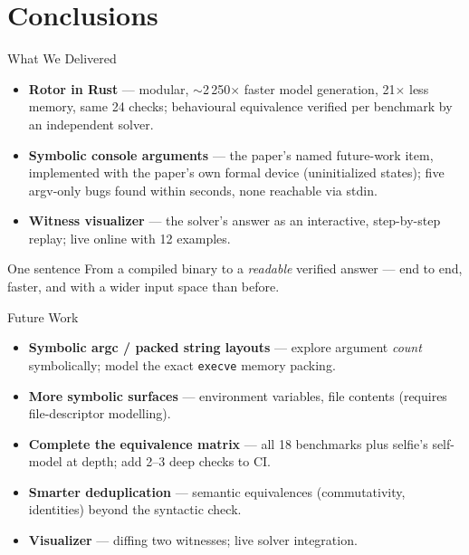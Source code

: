 \documentclass[aspectratio=169]{beamer}
\newcommand{\keylab}[1]{\textbf{\color{blue!55!black}#1}}
\begin{document}
\part{Conclusions}
\begin{frame}
  \partpage
\end{frame}

\begin{frame}{What We Delivered}
  \begin{itemize}\setlength\itemsep{0.55em}
    \item \keylab{Rotor in Rust} --- modular, $\sim$2\,250$\times$
          faster model generation, 21$\times$ less memory, same 24
          checks; behavioural equivalence verified per benchmark by an
          independent solver.
    \item \keylab{Symbolic console arguments} --- the paper's named
          future-work item, implemented with the paper's own formal
          device (uninitialized states); five argv-only bugs found
          within seconds, none reachable via stdin.
    \item \keylab{Witness visualizer} --- the solver's answer as an
          interactive, step-by-step replay; live online with 12
          examples.
  \end{itemize}
  \vspace{0.1cm}
  \begin{block}{One sentence}
    From a compiled binary to a \emph{readable} verified answer ---
    end to end, faster, and with a wider input space than before.
  \end{block}
\end{frame}

\begin{frame}{Future Work}
  \begin{itemize}\setlength\itemsep{0.5em}
    \item \textbf{Symbolic argc / packed string layouts} --- explore
          argument \emph{count} symbolically; model the exact
          \texttt{execve} memory packing.
    \item \textbf{More symbolic surfaces} --- environment variables,
          file contents (requires file-descriptor modelling).
    \item \textbf{Complete the equivalence matrix} --- all 18
          benchmarks plus selfie's self-model at depth; add 2--3 deep
          checks to CI.
    \item \textbf{Smarter deduplication} --- semantic equivalences
          (commutativity, identities) beyond the syntactic check.
    \item \textbf{Visualizer} --- diffing two witnesses; live solver
          integration.
  \end{itemize}
\end{frame}
\end{document}
